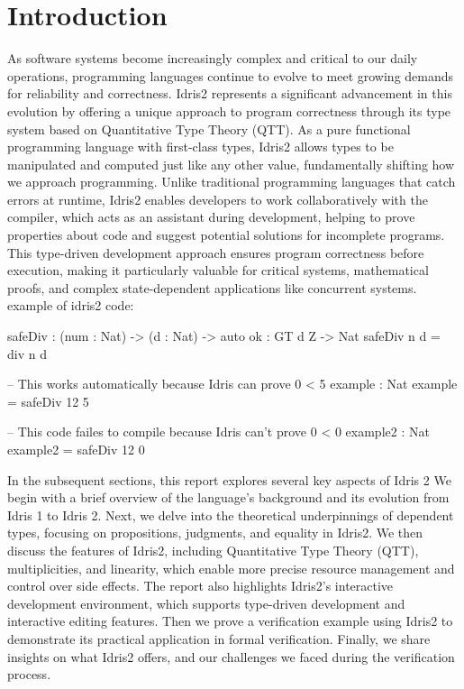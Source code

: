 \documentclass[]{rptuseminar}
\begin{document}
\section{Introduction}
\label{sec:introduction}
As software systems become increasingly complex and critical to our daily operations, programming languages continue to evolve to meet growing demands for reliability and correctness.
Idris2 represents a significant advancement in this evolution by offering a unique approach to program correctness through its type system based on Quantitative Type Theory (QTT).
As a pure functional programming language with first-class types, Idris2 allows types to be manipulated and computed just like any other value, fundamentally shifting how we approach programming.
Unlike traditional programming languages that catch errors at runtime, Idris2 enables developers to work collaboratively with the compiler, which acts as an assistant during development, helping to prove properties about code and suggest potential solutions for incomplete programs.
This type-driven development approach ensures program correctness before execution, making it particularly valuable for critical systems, mathematical proofs, and complex state-dependent applications like concurrent systems\cite{BradyYoutube2023}.
\\example of idris2 code:
\begin{idris}
	safeDiv : (num : Nat) -> (d : Nat) -> {auto ok : GT d Z} -> Nat  
	safeDiv n d  = div n d  

	-- This works automatically because Idris can prove 0 < 5  
	example : Nat  
	example = safeDiv 12 5

	-- This code failes to compile because Idris can't prove 0 < 0
	example2 : Nat
	example2 = safeDiv 12 0


\end{idris}
In the subsequent sections, this report explores several key aspects of Idris 2
We begin with a brief overview of the language's background and its evolution from Idris 1 to Idris 2.
Next, we delve into the theoretical underpinnings of dependent types, focusing on propositions, judgments, and equality in Idris2.
We then discuss the features of Idris2, including Quantitative Type Theory (QTT), multiplicities, and linearity, which enable more precise resource management and control over side effects.
The report also highlights Idris2's interactive development environment, which supports type-driven development and interactive editing features.
Then we prove a verification example using Idris2 to demonstrate its practical application in formal verification.
Finally, we share insights on what Idris2 offers, and our challenges we faced during the verification process.
\end{document}
